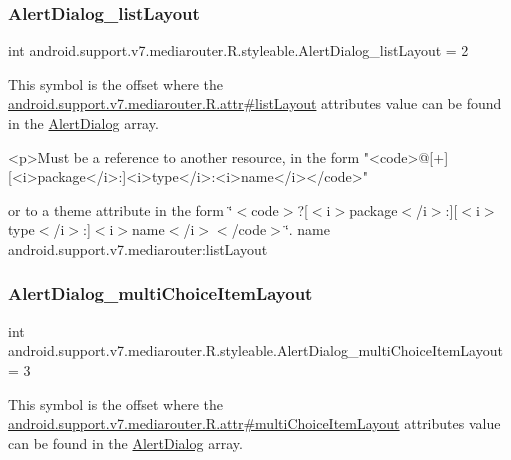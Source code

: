 \subsubsection{\texorpdfstring{Alert\+Dialog\+\_\+list\+Layout}{AlertDialog\_listLayout}}
{\footnotesize\ttfamily int android.\+support.\+v7.\+mediarouter.\+R.\+styleable.\+Alert\+Dialog\+\_\+list\+Layout = 2\hspace{0.3cm}{\ttfamily [static]}}

This symbol is the offset where the \hyperlink{classandroid_1_1support_1_1v7_1_1mediarouter_1_1R_1_1attr_a3e1b4d3a484b300077cba762ae959e8e}{android.\+support.\+v7.\+mediarouter.\+R.\+attr\#list\+Layout} attribute\textquotesingle{}s value can be found in the \hyperlink{classandroid_1_1support_1_1v7_1_1mediarouter_1_1R_1_1styleable_a2c8307beccb0eb2a93adf87cab8ef939}{Alert\+Dialog} array.

\begin{DoxyVerb}      <p>Must be a reference to another resource, in the form "<code>@[+][<i>package</i>:]<i>type</i>:<i>name</i></code>"
\end{DoxyVerb}
 or to a theme attribute in the form \char`\"{}$<$code$>$?\mbox{[}$<$i$>$package$<$/i$>$\+:\mbox{]}\mbox{[}$<$i$>$type$<$/i$>$\+:\mbox{]}$<$i$>$name$<$/i$>$$<$/code$>$\char`\"{}.  name android.\+support.\+v7.\+mediarouter\+:list\+Layout \mbox{\label{classandroid_1_1support_1_1v7_1_1mediarouter_1_1R_1_1styleable_a1e53127a3d6a2149e6dc386c82e69aaf}} 
\subsubsection{\texorpdfstring{Alert\+Dialog\+\_\+multi\+Choice\+Item\+Layout}{AlertDialog\_multiChoiceItemLayout}}
{\footnotesize\ttfamily int android.\+support.\+v7.\+mediarouter.\+R.\+styleable.\+Alert\+Dialog\+\_\+multi\+Choice\+Item\+Layout = 3\hspace{0.3cm}{\ttfamily [static]}}

This symbol is the offset where the \hyperlink{classandroid_1_1support_1_1v7_1_1mediarouter_1_1R_1_1attr_a81ad05b4e1a2ef405bde7ea12bd32b7d}{android.\+support.\+v7.\+mediarouter.\+R.\+attr\#multi\+Choice\+Item\+Layout} attribute\textquotesingle{}s value can be found in the \hyperlink{classandroid_1_1support_1_1v7_1_1mediarouter_1_1R_1_1styleable_a2c8307beccb0eb2a93adf87cab8ef939}{Alert\+Dialog} array.

